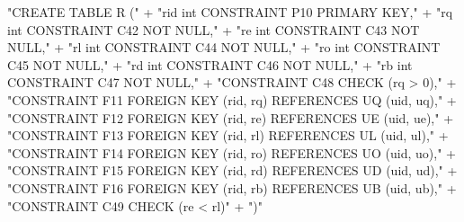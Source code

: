 \documentclass{article}
\def\nwendcode{\endtrivlist \endgroup}
\let\nwdocspar=\par
\theoremstyle{definition}
\begin{document}
"CREATE TABLE R ("
  + "rid int  CONSTRAINT P10 PRIMARY KEY,"
  + "rq  int  CONSTRAINT C42 NOT NULL,"
  + "re  int  CONSTRAINT C43 NOT NULL,"
  + "rl  int  CONSTRAINT C44 NOT NULL,"
  + "ro  int  CONSTRAINT C45 NOT NULL,"
  + "rd  int  CONSTRAINT C46 NOT NULL,"
  + "rb  int  CONSTRAINT C47 NOT NULL,"
  + "CONSTRAINT C48 CHECK (rq > 0),"
  + "CONSTRAINT F11 FOREIGN KEY (rid, rq) REFERENCES UQ (uid, uq),"
  + "CONSTRAINT F12 FOREIGN KEY (rid, re) REFERENCES UE (uid, ue),"
  + "CONSTRAINT F13 FOREIGN KEY (rid, rl) REFERENCES UL (uid, ul),"
  + "CONSTRAINT F14 FOREIGN KEY (rid, ro) REFERENCES UO (uid, uo),"
  + "CONSTRAINT F15 FOREIGN KEY (rid, rd) REFERENCES UD (uid, ud),"
  + "CONSTRAINT F16 FOREIGN KEY (rid, rb) REFERENCES UB (uid, ub),"
  + "CONSTRAINT C49 CHECK (re < rl)"
  + ")"
\nwendcode{}\nwdocspar
\end{document}
